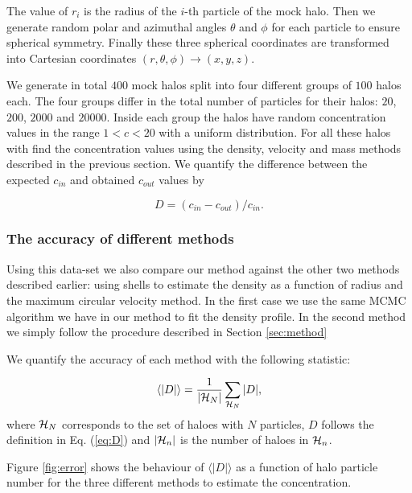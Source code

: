 \documentclass{emulateapj}
\newcommand{\avg}[1]{\langle{#1}\rangle}
\begin{document}
The value of $r_i$ is the radius of the $i$-th particle of the mock
halo.
Then we generate random polar and azimuthal angles $\theta$ and $\phi$
for each particle to ensure spherical symmetry.
Finally these three spherical coordinates are transformed into Cartesian coordinates
$(r,\theta,\phi) \rightarrow (x,y,z)$.



We generate in total $400$ mock halos split into four different
groups of $100$ halos each.
The four groups differ in the total number of particles for their halos:
$20$, $200$, $2000$ and $20000$.
Inside each group the halos have random concentration values in
the range $1<c<20$ with a uniform distribution.
For all these halos with find the concentration values using the
density, velocity and mass methods described in the previous
section. We quantify the difference between the expected $c_{in}$
and obtained $c_{out}$ values by

\begin{equation}
D=(c_{in}-c_{out})/c_{in}.
\label{eq:D}
\end{equation}



\subsubsection{The accuracy of different methods}



Using this data-set we also compare our method against the other two
methods described earlier: using shells to estimate the density as a
function of radius and the maximum circular velocity method.
In the first case we use the same MCMC algorithm we
have in our method to fit the density profile.
In the second method we simply follow the procedure described in
Section \ref{sec:method}

We quantify the accuracy of each method with the following statistic:

\begin{equation}
\avg{|D|}=\frac{1}{\left|{\cal{H}}_N\right|}\sum_{{\cal{H}}_N} |D|,
\end{equation}
%
where ${\cal{H}}_N$ corresponds to the set of haloes with $N$
particles, $D$ follows the definition in Eq. (\ref{eq:D}) and
$\left|{\cal{H}}_n\right|$ is the number of haloes in ${\cal{H}}_n$.


Figure \ref{fig:error} shows the behaviour of $\avg{|D|}$ as a function of
halo particle number for the three different methods to estimate the
concentration.
\end{document}
